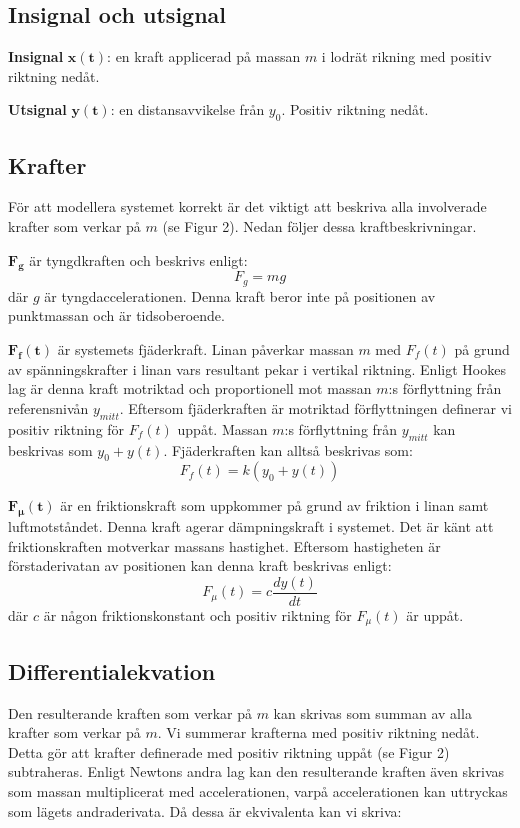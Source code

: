 \subsection{Insignal och utsignal}
\textbf{Insignal} $\bm{x(t)}$:
en kraft applicerad på massan $m$ i lodrät rikning med positiv riktning nedåt.

\textbf{Utsignal} $\bm{y(t)}$:
en distansavvikelse från $y_0$. Positiv riktning nedåt.

\subsection{Krafter}
För att modellera systemet korrekt är det viktigt att beskriva alla involverade krafter som verkar på $m$ (se Figur 2). Nedan följer dessa kraftbeskrivningar.

$\bm{F_g}$ är tyngdkraften och beskrivs enligt: 
$$F_g=mg$$
där $g$ är tyngdaccelerationen. Denna kraft beror inte på positionen av punktmassan och är tidsoberoende.

$\bm{F_f(t)}$ är systemets fjäderkraft. Linan påverkar massan $m$ med $F_f(t)$ på grund av spänningskrafter i linan vars resultant pekar i vertikal riktning. Enligt Hookes lag är denna kraft motriktad och proportionell mot massan $m$:s förflyttning från referensnivån $y_{mitt}$. Eftersom fjäderkraften är motriktad förflyttningen definerar vi positiv riktning för $F_f(t)$ uppåt. Massan $m$:s förflyttning från $y_{mitt}$ kan beskrivas som $y_0+y(t)$. Fjäderkraften kan alltså beskrivas som: $$F_f(t) = k(y_0+y(t))$$

$\bm{F_\mu(t)}$ är en friktionskraft som uppkommer på grund av friktion i linan samt luftmotståndet. Denna kraft agerar dämpningskraft i systemet.
Det är känt att friktionskraften motverkar massans hastighet. Eftersom hastigheten är förstaderivatan av positionen kan denna kraft beskrivas enligt: 
$$F_\mu(t) = c\frac{dy(t)}{dt}$$
där $c$ är någon friktionskonstant och positiv riktning för $F_\mu(t)$ är uppåt.

\subsection{Differentialekvation}
Den resulterande kraften som verkar på $m$ kan skrivas som summan av alla krafter som verkar på $m$. Vi summerar krafterna med positiv riktning nedåt. Detta gör att krafter definerade med positiv riktning uppåt (se Figur 2) subtraheras. Enligt Newtons andra lag kan den resulterande kraften även skrivas som massan multiplicerat med accelerationen, varpå accelerationen kan uttryckas som lägets andraderivata. Då dessa är ekvivalenta kan vi skriva:

